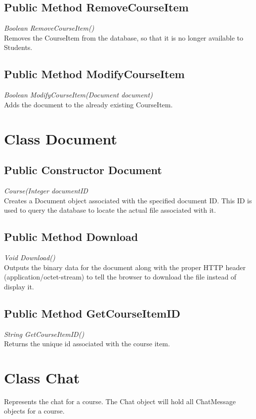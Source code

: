 \documentclass[16pt]{scrreprt}
\begin{document}
\subsection{Public Method RemoveCourseItem}
\textit{Boolean RemoveCourseItem()} \\
Removes the CourseItem from the database, so that it is no longer available to Students.

\subsection{Public Method ModifyCourseItem}
\textit{Boolean ModifyCourseItem(Document document)} \\
Adds the document to the already existing CourseItem.

\section{Class Document}

\subsection{Public Constructor Document}
\textit{Course(Integer documentID} \\
Creates a Document object associated with the specified document ID. This ID is used to query the database to locate the actual file associated with it.

\subsection{Public Method Download}
\textit{Void Download()} \\
Outputs the binary data for the document along with the proper HTTP header (application/octet-stream) to tell the browser to download the file instead of display it.

\subsection{Public Method GetCourseItemID}
\textit{String GetCourseItemID()} \\
Returns the unique id associated with the course item.

\section{Class Chat}
Represents the chat for a course. The Chat object will hold all ChatMessage objects for a course.
\end{document}
